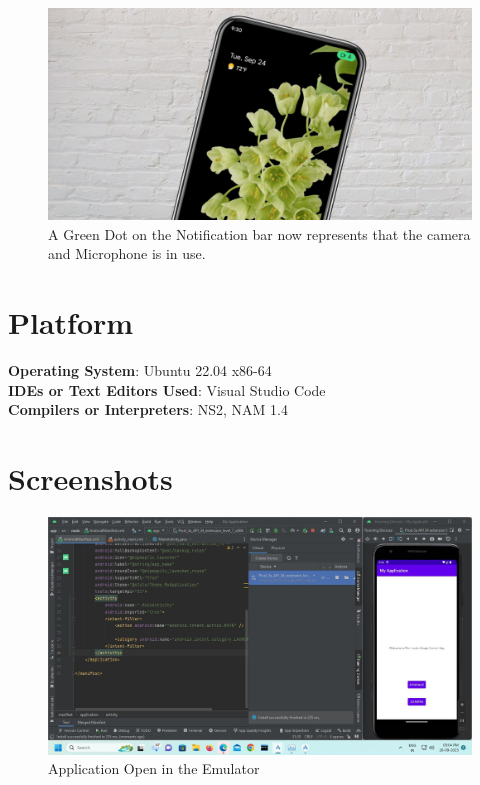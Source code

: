 \documentclass[11pt]{article}
\begin{document}
\begin{figure}[H]
    \centering
    \includegraphics[width=.95\textwidth]{green dot in latest android phones for camera/green dot in latest android phones for camera_6.jpg}
    \caption{A Green Dot on the Notification bar now represents that the camera and Microphone is in use. }
\end{figure}


\section{Platform}
\textbf{Operating System}: Ubuntu 22.04 x86-64 \\
\textbf{IDEs or Text Editors Used}: Visual Studio Code\\
\textbf{Compilers or Interpreters}: NS2, NAM 1.4\\

\section{Screenshots}

\begin{figure}[H]
    \centering
    \includegraphics[width=.95\textwidth]{../../Programs/Assignment 4/screenshots/1.jpeg}
    \caption{Application Open in the Emulator}
\end{figure}
\end{document}
